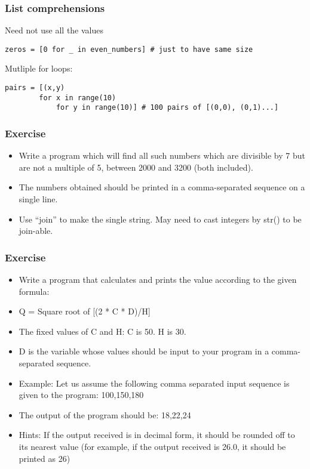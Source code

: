 \begin{frame}[fragile]\frametitle{List comprehensions}
Need not use all the values
  \begin{lstlisting}
zeros = [0 for _ in even_numbers] # just to have same size
  \end{lstlisting}
Mutliple for loops:
  \begin{lstlisting}
pairs = [(x,y)
		for x in range(10)
			for y in range(10)] # 100 pairs of [(0,0), (0,1)...]
  \end{lstlisting}
\end{frame}

\begin{frame}[fragile]\frametitle{Exercise}
  \begin{itemize}
  \item Write a program which will find all such numbers which are divisible by 7 but are not a multiple of 5,
between 2000 and 3200 (both included).
  \item The numbers obtained should be printed in a comma-separated sequence on a single line.
  \item Use ``join'' to make the single string. May need to cast integers by str() to be join-able.
  \end{itemize}  
\end{frame}

\begin{frame}[fragile]\frametitle{Exercise}
  \begin{itemize}
  \item Write a program that calculates and prints the value according to the given formula:
  \item Q = Square root of [(2 * C * D)/H]
  \item The fixed values of C and H: C is 50. H is 30.
  \item D is the variable whose values should be input to your program in a comma-separated sequence.
  \item Example: Let us assume the following comma separated input sequence is given to the program: 100,150,180
  \item The output of the program should be: 18,22,24
  \item Hints: If the output received is in decimal form, it should be rounded off to its nearest value (for example, if the output received is 26.0, it should be printed as 26)
  \end{itemize}  
\end{frame}

